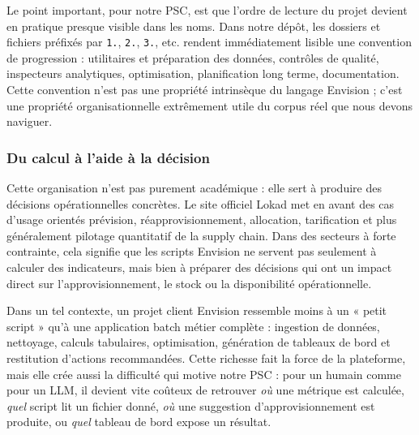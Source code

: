 Le point important, pour notre PSC, est que l'ordre de lecture du projet devient en pratique presque visible dans les noms. Dans notre dépôt, les dossiers et fichiers préfixés par \texttt{1.}, \texttt{2.}, \texttt{3.}, etc. rendent immédiatement lisible une convention de progression : utilitaires et préparation des données, contrôles de qualité, inspecteurs analytiques, optimisation, planification long terme, documentation. Cette convention n'est pas une propriété intrinsèque du langage Envision ; c'est une propriété organisationnelle extrêmement utile du corpus réel que nous devons naviguer.

\subsubsection{Du calcul à l'aide à la décision}

Cette organisation n'est pas purement académique : elle sert à produire des décisions opérationnelles concrètes. Le site officiel Lokad met en avant des cas d'usage orientés prévision, réapprovisionnement, allocation, tarification et plus généralement pilotage quantitatif de la supply chain. Dans des secteurs à forte contrainte, cela signifie que les scripts Envision ne servent pas seulement à calculer des indicateurs, mais bien à préparer des décisions qui ont un impact direct sur l'approvisionnement, le stock ou la disponibilité opérationnelle.

Dans un tel contexte, un projet client Envision ressemble moins à un « petit script » qu'à une application batch métier complète : ingestion de données, nettoyage, calculs tabulaires, optimisation, génération de tableaux de bord et restitution d'actions recommandées. Cette richesse fait la force de la plateforme, mais elle crée aussi la difficulté qui motive notre PSC : pour un humain comme pour un LLM, il devient vite coûteux de retrouver \textit{où} une métrique est calculée, \textit{quel} script lit un fichier donné, \textit{où} une suggestion d'approvisionnement est produite, ou \textit{quel} tableau de bord expose un résultat.

